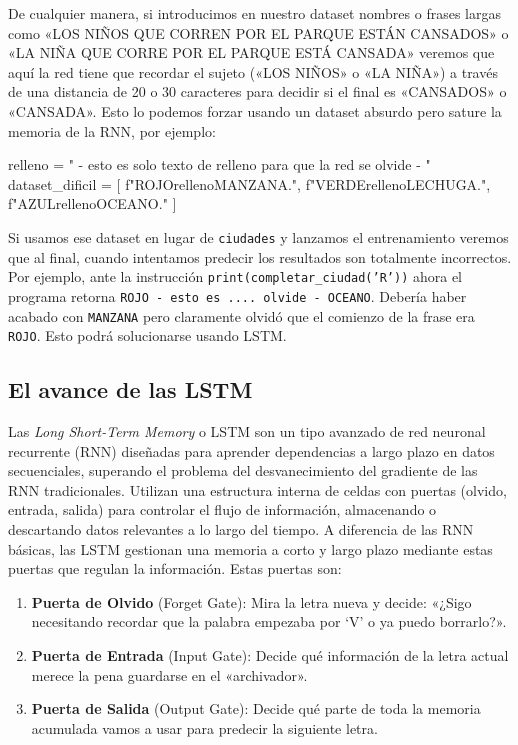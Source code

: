 \documentclass[a4paper,11pt]{article}
\begin{document}
De cualquier manera, si introducimos en nuestro dataset nombres o frases
largas como «LOS NIÑOS QUE CORREN POR EL PARQUE ESTÁN CANSADOS» o «LA
NIÑA QUE CORRE POR EL PARQUE ESTÁ CANSADA» veremos que aquí la red tiene
que recordar el sujeto («LOS NIÑOS» o «LA NIÑA») a través de una
distancia de 20 o 30 caracteres para decidir si el final es «CANSADOS» o
«CANSADA». Esto lo podemos forzar usando un dataset absurdo pero sature
la memoria de la RNN, por ejemplo:

\begin{codigo}
relleno = " - esto es solo texto de relleno para que la red se olvide - "
dataset_dificil = [
    f"ROJO{relleno}MANZANA.",
    f"VERDE{relleno}LECHUGA.",
    f"AZUL{relleno}OCEANO."
]
\end{codigo}

Si usamos ese dataset en lugar de \texttt{ciudades} y lanzamos el
entrenamiento veremos que al final, cuando intentamos predecir los
resultados son totalmente incorrectos. Por ejemplo, ante la instrucción
\texttt{print(completar\_ciudad('R'))} ahora el programa retorna
\texttt{ROJO - esto es .... olvide - OCEANO}. Debería haber
acabado con \texttt{MANZANA} pero claramente olvidó que el comienzo de
la frase era \texttt{ROJO}. Esto podrá solucionarse usando LSTM.


\subsection{El avance de las LSTM}

Las \emph{Long Short-Term Memory} o LSTM son un tipo avanzado de red
neuronal recurrente (RNN) diseñadas para aprender dependencias a largo
plazo en datos secuenciales, superando el problema del desvanecimiento
del gradiente de las RNN tradicionales. Utilizan una estructura interna
de celdas con puertas (olvido, entrada, salida) para controlar el flujo
de información, almacenando o descartando datos relevantes a lo largo
del tiempo. A diferencia de las RNN básicas, las LSTM gestionan una
memoria a corto y largo plazo mediante estas puertas que regulan la
información. Estas puertas son:

\begin{enumerate}
\def\labelenumi{\arabic{enumi}.}
\item
  \textbf{Puerta de Olvido} (Forget Gate): Mira la letra nueva y decide:
  «¿Sigo necesitando recordar que la palabra empezaba por `V' o ya puedo
  borrarlo?».
\item
  \textbf{Puerta de Entrada} (Input Gate): Decide qué información de la
  letra actual merece la pena guardarse en el «archivador».
\item
  \textbf{Puerta de Salida} (Output Gate): Decide qué parte de toda la
  memoria acumulada vamos a usar para predecir la siguiente letra.
\end{enumerate}
\end{document}

